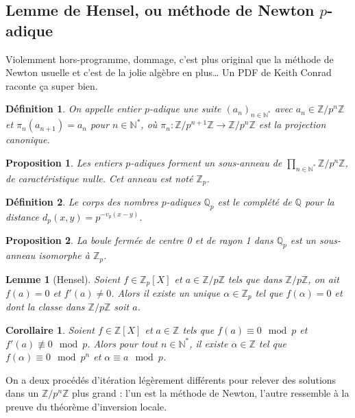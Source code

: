 \documentclass[a4paper, 11pt]{article}
\def\Z{\mathbb{Z}}
\def\N{\mathbb{N}}
\def\Q{\mathbb{Q}}
\newtheorem*{definition}{Définition}
\newtheorem*{proposition}{Proposition}
\newtheorem*{lemma}{Lemme}
\newtheorem*{corollary}{Corollaire}
\begin{document}
\subsection{Lemme de Hensel, ou méthode de Newton $p$-adique}

Violemment hors-programme, dommage, c'est plus original que la méthode de Newton
usuelle et c'est de la jolie algèbre en plus… Un PDF de Keith Conrad raconte ça
super bien.

\begin{definition}
  On appelle \emph{entier $p$-adique} une suite $(a_n)_{n \in \N^*}$
  avec $a_n \in \Z/p^n\Z$ et $\pi_n(a_{n+1}) = a_n$ pour $n \in \N^*$,
  où $\pi_n : \Z/p^{n+1}\Z \to \Z/p^n\Z$ est la projection canonique.
\end{definition}
\begin{proposition}
  Les entiers $p$-adiques forment un sous-anneau de
  $\prod_{n \in \N^*} \Z/p^n\Z$, de caractéristique nulle. Cet anneau
  est noté $\Z_p$.
\end{proposition}

\begin{definition}
  Le \emph{corps des nombres $p$-adiques} $\Q_p$ est le complété de
  $\Q$ pour la distance $d_p(x,y) = p^{-v_p(x-y)}$.
\end{definition}
\begin{proposition}
  La boule fermée de centre 0 et de rayon 1 dans $\Q_p$ est un
  sous-anneau isomorphe à $\Z_p$.
\end{proposition}

\begin{lemma}[Hensel]
  Soient $f \in \Z_p[X]$ et $a \in \Z/p\Z$ tels que dans $\Z/p\Z$, on
  ait $f(a) = 0$ et $f'(a) \neq 0$. Alors il existe un unique
  $\alpha \in \Z_p$ tel que $f(\alpha) = 0$ et dont la classe dans
  $\Z/p\Z$ soit $a$.
\end{lemma}

\begin{corollary}
  Soient $f \in \Z[X]$ et $a \in \Z$ tels que $f(a) \equiv 0 \mod p$
  et $f'(a) \not\equiv 0 \mod p$. Alors pour tout $n \in \N^*$, il
  existe $\alpha \in \Z$ tel que $f(\alpha) \equiv 0 \mod p^n$ et
  $\alpha \equiv a \mod p$.
\end{corollary}

On a deux procédés d'itération légèrement différents pour relever des solutions
dans un $\Z/p^n\Z$ plus grand : l'un est la méthode de Newton, l'autre ressemble
à la preuve du théorème d'inversion locale.
\end{document}
